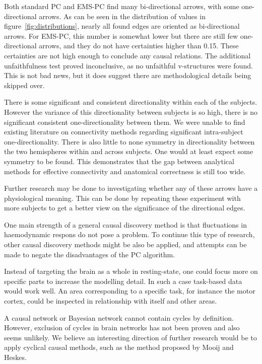 \documentclass[a4paper, english]{article}
\begin{document}
Both standard PC and EMS-PC find many bi-directional arrows, with some one-directional arrows.
As can be seen in the distribution of values in figure~\ref{fig:distributions}, nearly all found edges are oriented as bi-directional arrows.
For EMS-PC, this number is somewhat lower but there are still few one-directional arrows, and they do not have certainties higher than 0.15.
These certainties are not high enough to conclude any causal relations.
The additional unfaithfulness test proved inconclusive, as no unfaithful v-structures were found.
This is not bad news, but it does suggest there are methodological details being skipped over.

There is some significant and consistent directionality within each of the subjects.
However the variance of this directionality between subjects is so high, there is no significant consistent one-directionality between them.
We were unable to find existing literature on connectivity methods regarding significant intra-subject one-directionality.
There is also little to none symmetry in directionality between the two hemispheres within and across subjects.
One would at least expect some symmetry to be found.
This demonstrates that the gap between analytical methods for effective connectivity and anatomical correctness is still too wide.

Further research may be done to investigating whether any of these arrows have a physiological meaning.
This can be done by repeating these experiment with more subjects to get a better view on the significance of the directional edges.

One main strength of a general causal discovery method is that fluctuations in haemodynamic respons do not pose a problem.
To continue this type of research, other causal discovery methods might be also be applied, and attempts can be made to negate the disadvantages of the PC algorithm.

Instead of targeting the brain as a whole in resting-state, one could focus more on specific parts to increase the modelling detail.
In such a case task-based data would work well.
An area corresponding to a specific task, for instance the motor cortex, could be inspected in relationship with itself and other areas.

A causal network or Bayesian network cannot contain cycles by definition.
However, exclusion of cycles in brain networks has not been proven and also seems unlikely.
We believe an interesting direction of further research would be to apply cyclical causal methods, such as the method proposed by Mooij and Heskes\cite{Mooij20013}.
\end{document}
